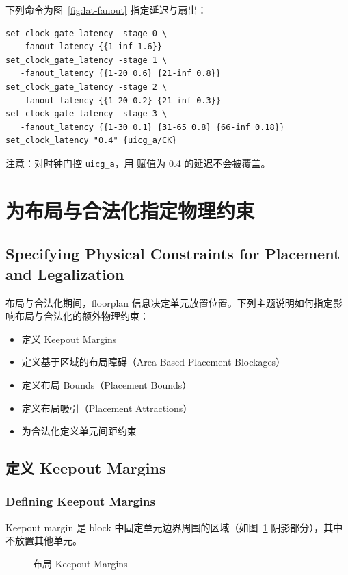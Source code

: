 下列命令为图~\ref{fig:lat-fanout} 指定延迟与扇出：
\begin{lstlisting}
set_clock_gate_latency -stage 0 \
   -fanout_latency {{1-inf 1.6}}
set_clock_gate_latency -stage 1 \
   -fanout_latency {{1-20 0.6} {21-inf 0.8}}
set_clock_gate_latency -stage 2 \
   -fanout_latency {{1-20 0.2} {21-inf 0.3}}
set_clock_gate_latency -stage 3 \
   -fanout_latency {{1-30 0.1} {31-65 0.8} {66-inf 0.18}}
set_clock_latency "0.4" {uicg_a/CK}
\end{lstlisting}

注意：对时钟门控 \texttt{uicg\_a}，用 \cmd{set\_clock\_latency} 赋值为 0.4 的延迟不会被覆盖。

\section{为布局与合法化指定物理约束}
\subsection*{Specifying Physical Constraints for Placement and Legalization}

布局与合法化期间，floorplan 信息决定单元放置位置。下列主题说明如何指定影响布局与合法化的额外物理约束：
\begin{itemize}
  \item 定义 Keepout Margins
  \item 定义基于区域的布局障碍（Area-Based Placement Blockages）
  \item 定义布局 Bounds（Placement Bounds）
  \item 定义布局吸引（Placement Attractions）
  \item 为合法化定义单元间距约束
\end{itemize}

\subsection{定义 Keepout Margins}
\subsubsection*{Defining Keepout Margins}

Keepout margin 是 block 中固定单元边界周围的区域（如图~\ref{fig:keepout} 阴影部分），其中不放置其他单元。

\begin{figure}[htbp]
\centering
{}
\caption{布局 Keepout Margins}
\label{fig:keepout}
\end{figure}

